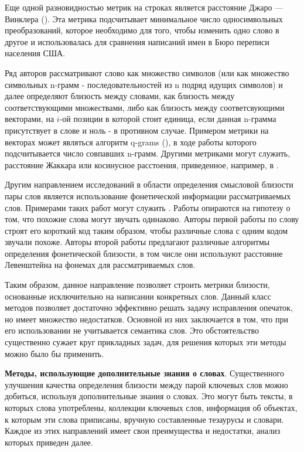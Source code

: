 Еще одной разновидностью метрик на строках является расстояние Джаро — Винклера (\cite{jaro1,jaro2}). Эта метрика подсчитывает минимальное число односимвольных преобразований, которое необходимо для того, чтобы изменить одно слово в другое и использовалась для сравнения написаний имен в Бюро переписи населения США.

Ряд авторов рассматривают слово как множество символов (или как множество символьных n-грамм - последовательностей из n подряд идущих символов) и далее определяют близость между словами, как близость между соответствующими множествами, либо как близость между соответсвующими векторами, на $i$-ой позиции в которой стоит единица, если данная n-грамма присутствует в слове и ноль - в противном случае. Примером метрики на векторах может являться алгоритм q-grams (\cite{qgrams}), в ходе работы которого подсчитывается число совпавших n-грамм. Другими метриками могут служить,  расстояние Жаккара или косинусное расстоения, приведенное, например, в \cite{sim_metr}.

Другим направлением исследований в области определения смысловой близости пары слов является использование фонетической информации рассматриваемых слов. Примерами таких работ могут служить \cite{soundex,phone_sim}. Работы опираются на гипотезу о том, что похожие слова могут звучать одинаково. Авторы первой работы по слову строят его короткий код таким образом, чтобы различные слова с одним кодом звучали похоже. Авторы второй работы предлагают различные алгоритмы определения фонетической близости, в том числе они используют расстояние Левенштейна на фонемах для рассматриваемых слов.

Таким образом, данное направление позволяет строить метрики близости, основанные исключительно на написании конкретных слов. Данный класс методов позволяет достаточно эффективно решать задачу исправления опечаток, но имеет множество недостатков. Основной из них заключается в том, что при его использовании не учитывается семантика слов. Это обстоятельство существенно сужает круг прикладных задач, для решения которых эти методы можно было бы применить. 

\textbf{Методы, использующие дополнительные знания о словах}. Существенного улучшения качества определения близости между парой ключевых слов можно добиться, используя дополнительные знания о словах. Это могут быть тексты, в которых слова употреблены, коллекции ключевых слов, информация об объектах, к которым эти слова приписаны, вручную составленные тезаурусы и словари. Каждое из этих направлений имеет свои преимущества и недостатки, анализ которых приведен далее.


